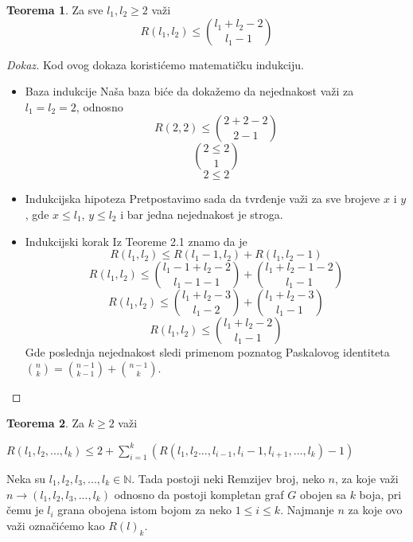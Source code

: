 \documentclass{article}
\theoremstyle{definition}
\newtheorem{teorema}{Teorema}[section]
\newcommand{\dokaz}[1]{\begin{proof}[Dokaz]#1\end{proof}}
\begin{document}
	
	
	\begin{teorema}
		Za sve $l_1,l_2 \geq 2$ važi
		\[R(l_1,l_2) \leq {l_1+l_2-2\choose l_1-1} 
		\]
	\end{teorema}
	\dokaz{
		Kod ovog dokaza koristićemo matematičku indukciju. %
		\begin{itemize}
		\item Baza indukcije \newline
		Naša baza biće da dokažemo da nejednakost važi za $l_1=l_2=2$, odnosno 
		\[ R(2,2) \leq {2+2-2 \choose 2-1}
		\]
		\[
		2 \leq 2 \choose 1
		\]
		\[
		2 \leq 2
		\]
		\item Indukcijska hipoteza \newline
		Pretpostavimo sada da tvrđenje važi za sve brojeve $x$ i $y$, gde $x \leq l_1$, $y \leq l_2$ i bar jedna nejednakost je stroga.
		
		\item Indukcijski korak \newline
		Iz Teoreme 2.1 znamo da je
		\[
		R(l_1,l_2) \leq R(l_1-1, l_2) + R(l_1, l_2-1)
		\]
		\[
		R(l_1,l_2) \leq {{l_1-1+l_2-2 \choose l_1-1-1} + {l_1+l_2-1-2 \choose l_1-1}}
		\]
		\[
		R(l_1,l_2) \leq {{l_1+l_2-3 \choose l_1-2} + {l_1+l_2-3 \choose l_1-1}}
		\]
		\[
		R(l_1,l_2) \leq {l_1+l_2-2 \choose l_1-1}
		\]
		Gde poslednja nejednakost sledi primenom poznatog Paskalovog identiteta ${n \choose k} = {n-1 \choose k - 1} + {n-1 \choose k}$.
		\end{itemize}
	}
	
	\begin{teorema}
		Za $k \geq 2$ važi \newline
		
		$ R(l_1, l_2, ... , l_k) \leq 2 + \sum\limits_{i=1}^{k}(R(l_1, l_2 ... , l_{i-1}, l_i-1, l_{i+1}, ... , l_k)-1) $
	\end{teorema}
	
	
	Neka su $l_1, l_2, l_3, ... , l_k \in \mathbb{N}$. Tada postoji neki Remzijev broj, neko $n$, za koje važi $n \rightarrow (l_1, l_2, l_3, ... , l_k)$ odnosno da postoji kompletan graf $G$ obojen sa $k$ boja, pri čemu je $l_i$ grana obojena istom bojom za neko $1 \leq i \leq k$. Najmanje $n$ za koje ovo važi označićemo kao $R(l)_k$. 
	
\end{document}
